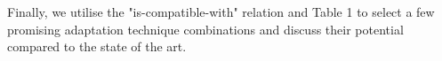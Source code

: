 Finally, we utilise the "is-compatible-with" relation and Table 1 to select a few promising adaptation technique combinations and discuss their potential compared to the state of the art.

